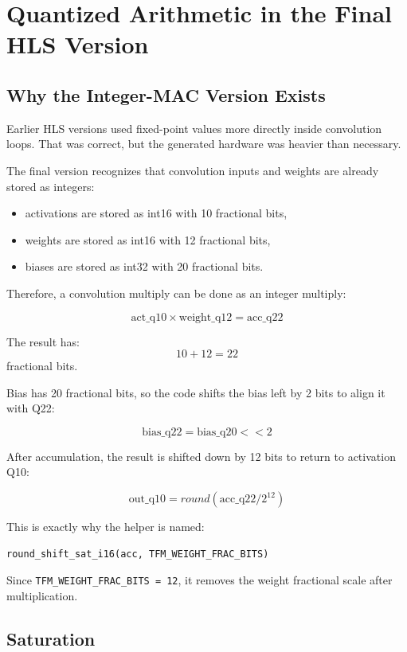 \documentclass[11pt]{article}
\newcommand{\code}[1]{\texttt{#1}}
\begin{document}
\section{Quantized Arithmetic in the Final HLS Version}

\subsection{Why the Integer-MAC Version Exists}

Earlier HLS versions used fixed-point values more directly inside convolution loops.
That was correct, but the generated hardware was heavier than necessary.

The final version recognizes that convolution inputs and weights are already stored as integers:

\begin{itemize}[leftmargin=1.4em]
  \item activations are stored as int16 with 10 fractional bits,
  \item weights are stored as int16 with 12 fractional bits,
  \item biases are stored as int32 with 20 fractional bits.
\end{itemize}

Therefore, a convolution multiply can be done as an integer multiply:

\[
  \text{act\_q10} \times \text{weight\_q12}
  =
  \text{acc\_q22}
\]

The result has:
\[
  10 + 12 = 22
\]
fractional bits.

Bias has 20 fractional bits, so the code shifts the bias left by 2 bits to align it with Q22:

\[
  \text{bias\_q22} = \text{bias\_q20} << 2
\]

After accumulation, the result is shifted down by 12 bits to return to activation Q10:

\[
  \text{out\_q10} = round(\text{acc\_q22} / 2^{12})
\]

This is exactly why the helper is named:

\begin{lstlisting}
round_shift_sat_i16(acc, TFM_WEIGHT_FRAC_BITS)
\end{lstlisting}

Since \code{TFM\_WEIGHT\_FRAC\_BITS = 12}, it removes the weight fractional scale after multiplication.

\subsection{Saturation}
\end{document}
